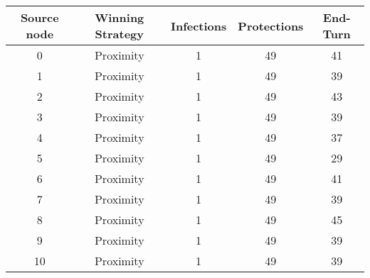 \documentclass[results.tex]{subfiles}
\begin{document}
    \begin{center}
        \begin{tabular}{| c || c | c | c | c |}
            \hline
            {\bfseries Source node} & {\bfseries Winning Strategy} & {\bfseries Infections} & {\bfseries Protections}
            & {\bfseries End-Turn}
            \\  %
            \hline\hline
            0                       & Proximity                    & 1                      & 49                      & 41                   \\
            \hline
            1                       & Proximity                    & 1                      & 49                      & 39                   \\
            \hline
            2                       & Proximity                    & 1                      & 49                      & 43                   \\
            \hline
            3                       & Proximity                    & 1                      & 49                      & 39                   \\
            \hline
            4                       & Proximity                    & 1                      & 49                      & 37                   \\
            \hline
            5                       & Proximity                    & 1                      & 49                      & 29                   \\
            \hline
            6                       & Proximity                    & 1                      & 49                      & 41                   \\
            \hline
            7                       & Proximity                    & 1                      & 49                      & 39                   \\
            \hline
            8                       & Proximity                    & 1                      & 49                      & 45                   \\
            \hline
            9                       & Proximity                    & 1                      & 49                      & 39                   \\
            \hline
            10                      & Proximity                    & 1                      & 49                      & 39                   \\

\end{tabular}
\end{center}
\end{document}
